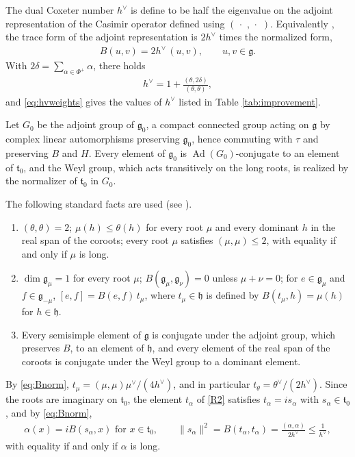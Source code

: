 \documentclass[leqno,10pt]{amsart}
\theoremstyle{definition}
\numberwithin{equation}{section}
\newcommand{\h}{\mathfrak{h}}
\newcommand{\dum}{\,\cdot\,\,}
\newcommand{\al}{\alpha}
\newcommand{\g}{\mathfrak{g}}
\newcommand{\Ad}{\operatorname{Ad}}
\newcommand{\gz}{\g_{0}}
\newcommand{\hv}{h^\vee}
\newcommand{\norm}[1]{\lVert #1\rVert}
\begin{document}
The dual Coxeter number $\hv$ is define to be half the eigenvalue on the adjoint representation of the Casimir operator defined using $(\dum, \dum)$. Equivalently \cite[(14.30) and (14.32)]{Fuchs-Schweigert}, the trace form of the adjoint representation is $2\hv$ times the normalized form,
\begin{align}\label{eq:Bnorm}
B(u, v) = 2\hv\,(u, v), \qquad u, v \in \g.
\end{align}
With $2\delta = \sum_{\al \in \Phi^{+}}\al$, there holds \cite[Section~32.4]{Etingof-liegroups}
\begin{align}\label{eq:hvweights}
\hv = 1 + \frac{(\theta, 2\delta)}{(\theta, \theta)},
\end{align}
and \eqref{eq:hvweights} gives the values of $\hv$ listed in Table \ref{tab:improvement}.

Let $G_{0}$ be the adjoint group of $\gz$, a compact connected group acting on $\g$ by complex linear automorphisms preserving $\gz$, hence commuting with $\tau$ and preserving $B$ and $H$. Every element of $\gz$ is $\Ad(G_{0})$-conjugate to an element of $\mathfrak{t}_{0}$, and the Weyl group, which acts transitively on the long roots, is realized by the normalizer of $\mathfrak{t}_{0}$ in $G_{0}$. 

The following standard facts are used (see \cite{Humphreys}).
\begin{enumerate}[label=(R\arabic*), ref=(R\arabic*)]
\item\label{R1} $(\theta,\theta)=2$; $\mu(h)\le\theta(h)$ for every root $\mu$ and every dominant $h$ in the real span of the coroots; every root $\mu$ satisfies $(\mu,\mu)\le2$, with equality if and only if $\mu$ is long.
\item\label{R2} $\dim\g_\mu=1$ for every root $\mu$; $B(\g_\mu,\g_\nu)=0$ unless $\mu+\nu=0$; for $e\in\g_\mu$ and $f\in\g_{-\mu}$, $[e,f]=B(e,f)\,t_\mu$, where $t_{\mu} \in \h$ is defined by $B(t_\mu,h)=\mu(h)$ for $h\in\h$.
\item\label{R3} Every semisimple element of $\g$ is conjugate under the adjoint group, which preserves $B$, to an element of $\h$, and every element of the real span of the coroots is conjugate under the Weyl group to a dominant element.
\end{enumerate}
By \eqref{eq:Bnorm}, $t_{\mu} = (\mu, \mu)\mu^{\vee}/(4\hv)$, and in particular $t_{\theta} = \theta^{\vee}/(2\hv)$. Since the roots are imaginary on $\mathfrak{t}_{0}$, the element $t_{\al}$ of \ref{R2} satisfies $t_{\al} = i s_{\al}$ with $s_{\al} \in \mathfrak{t}_{0}$, and by \eqref{eq:Bnorm},
\begin{align}\label{eq:salpha}
\al(x) = iB(s_{\al}, x) \text{ for } x \in \mathfrak{t}_{0}, \qquad \norm{s_{\al}}^{2} = B(t_{\al}, t_{\al}) = \frac{(\al, \al)}{2\hv} \leq \frac{1}{\hv},
\end{align}
with equality if and only if $\al$ is long.
\end{document}
